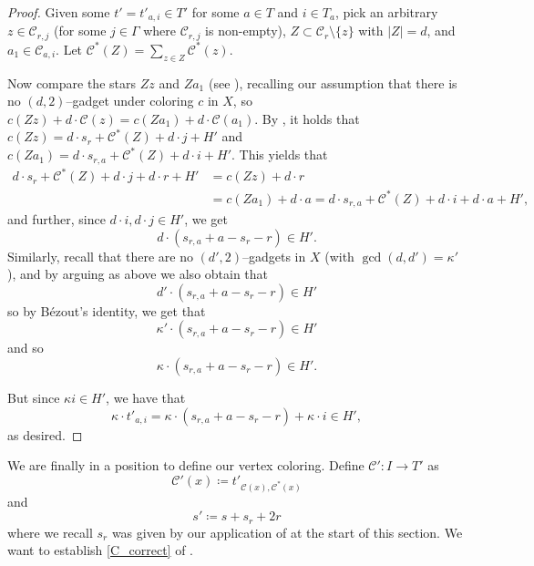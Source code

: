 \documentclass{article}
\newcommand{\beq}[1]{\begin{equation}\label{#1}}
\newcommand{\enq}[0]{\end{equation}}
\newcommand{\cC}{\mathcal{C} }
\theoremstyle{definition}
\begin{document}
\begin{proof}
Given some $t'=t'_{a, i}\in T'$ for some $a\in T$ and $i\in T_a$, pick an arbitrary $z \in \cC_{r,j}$ (for some $j\in\Gamma$ where $\cC_{r,j}$ is non-empty),  $Z\subset \cC_r\setminus \{z\}$ with $|Z|=d$, and $a_1\in \cC_{a,i}$. Let $\cC^*(Z)=\sum_{z\in Z} \cC^*(z)$. 

Now compare the stars $Zz$ and $Za_1$ (see ), recalling our assumption that there is no $(d, 2)$--gadget under coloring $c$ in $X$, so $c(Zz)+d\cdot\cC(z)=c(Za_1)+d\cdot \cC(a_1)$. By , it holds that $c(Zz)= d\cdot s_r + \cC^*(Z)+d\cdot j+H'$ and $c(Za_1)=d\cdot s_{r,a}+\cC^*(Z)+d\cdot i+H'$. This yields that
\[\begin{aligned}
    d\cdot s_r + \cC^*(Z)+d\cdot j + d\cdot r+H'&=c(Zz) + d\cdot r \\
    &=c(Za_1) + d\cdot a = d\cdot s_{r,a}+\cC^*(Z)+d\cdot i+d\cdot a+H',
\end{aligned}\]
and further, since $d\cdot i, d\cdot j\in H'$, we get 
\[d\cdot (s_{r,a} +a -s_r-r)\in H'.\] 
Similarly, recall that there are no $(d', 2)$--gadgets in $X$ (with $\gcd(d, d')=\kappa'$), and by arguing as above we also obtain that
$$d'\cdot (s_{r,a}+a-s_r-r)\in H'$$ 
so by B\'ezout's identity, we get that 
$$\kappa'\cdot (s_{r,a}+a-s_r-r)\in H'$$ 
and so
$$\kappa\cdot (s_{r,a}+a-s_r-r)\in H'.$$

But since $\kappa i\in H'$, we have that
$$\kappa\cdot  t'_{a,i} =  \kappa\cdot (s_{r,a}+a-s_r-r)+\kappa\cdot i\in H',$$ 
as desired.
\end{proof}
We are finally in a position to define our vertex coloring. Define $\cC':I \to T'$ as
\beq{defC"}\cC'(x)\coloneqq t'_{\cC(x),\cC^*(x)}\enq
and
\beq{s'def}s'\coloneqq s+s_r+2r\enq
where we recall $s_r$ was given by our application of  at the start of this section. We want to establish \cref{C_correct} of .
\end{document}
